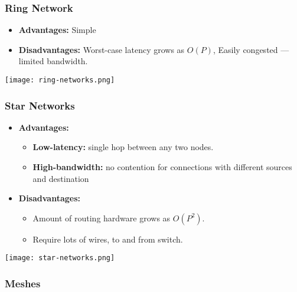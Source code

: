 \documentclass[../main.tex]{subfiles}
\begin{document}
\subsubsection{Ring Network}

\begin{multicols}{2}
	\begin{itemize}
		\item \textbf{Advantages:} Simple
		\item \textbf{Disadvantages:} Worst-case latency grows as \(O(P)\), Easily congested --- limited bandwidth.
	\end{itemize}

	\begin{center}
		\texttt{[image: ring-networks.png]}
	\end{center}
\end{multicols}

\subsubsection{Star Networks}

\begin{multicols}{2}
	\begin{itemize}
		\item \textbf{Advantages:}
		      \begin{itemize}
			      \item \textbf{Low-latency:} single hop between any two nodes.
			      \item \textbf{High-bandwidth:} no contention for connections with different sources and destination
		      \end{itemize}
		\item \textbf{Disadvantages:}
		      \begin{itemize}
			      \item Amount of routing hardware grows as \(O(P^2)\).
			      \item Require lots of wires, to and from switch.
		      \end{itemize}
	\end{itemize}

	\begin{center}
		\texttt{[image: star-networks.png]}
	\end{center}
\end{multicols}

\subsubsection{Meshes}
\end{document}
